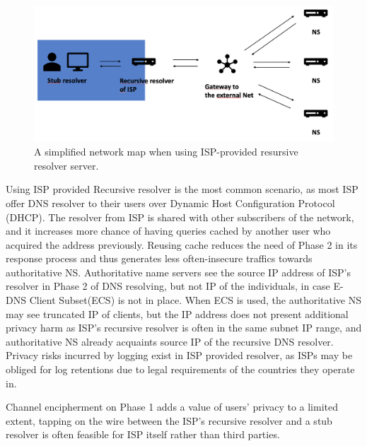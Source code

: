 \documentclass[a4paper,12pt]{article}
\begin{document}
\begin{figure}[h!]
    \begin{center}
    \includegraphics*[width=0.6\columnwidth]{img/isp-recursive}
    \end{center}
    \caption{A simplified network map when using ISP-provided resursive resolver server.}
    \label{isprecursive}
\end{figure}
Using ISP provided Recursive resolver is the most common scenario, as most ISP offer DNS resolver to their users over Dynamic Host Configuration Protocol (DHCP).
The resolver from ISP is shared with other subscribers of the network, and it increases more chance of having queries cached by another user who acquired the address previously.
Reusing cache reduces the need of Phase 2 in its response process \cite{wang2013analysis} and thus generates less often-insecure traffics towards authoritative NS. 
Authoritative name servers see the source IP address of ISP's resolver in Phase 2 of DNS resolving, but not IP of the individuals, in case E-DNS Client Subset(ECS) is not in place.
When ECS is used, the authoritative NS may see truncated IP of clients\cite{kintis2016understanding}, but the IP address does not present additional privacy harm as ISP's recursive resolver is often in the same subnet IP range, and authoritative NS already acquaints source IP of the recursive DNS resolver. 
Privacy risks incurred by logging exist in ISP provided resolver, as ISPs may be obliged for log retentions due to legal requirements of the countries they operate in.

Channel encipherment on Phase 1 adds a value of users' privacy to a limited extent, tapping on the wire between the ISP's recursive resolver and a stub resolver is often feasible for ISP itself rather than third parties.
\end{document}

